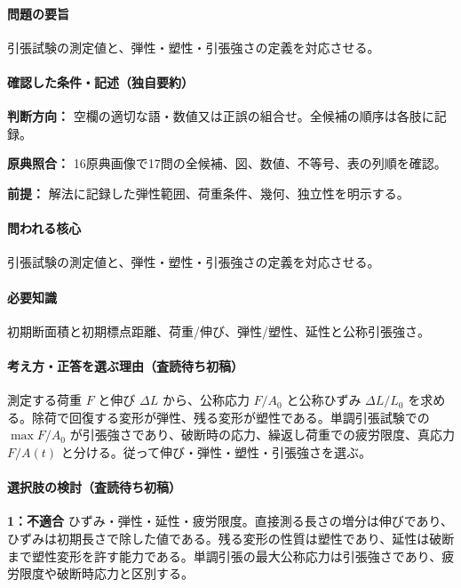 \paragraph{問題の要旨} 引張試験の測定値と、弾性・塑性・引張強さの定義を対応させる。

\paragraph{確認した条件・記述（独自要約）}\mbox{}\par

\noindent\textbf{判断方向：} 空欄の適切な語・数値又は正誤の組合せ。全候補の順序は各肢に記録。\par

\noindent\textbf{原典照合：} 16原典画像で17問の全候補、図、数値、不等号、表の列順を確認。\par

\noindent\textbf{前提：} 解法に記録した弾性範囲、荷重条件、幾何、独立性を明示する。\par

\paragraph{問われる核心} 引張試験の測定値と、弾性・塑性・引張強さの定義を対応させる。

\paragraph{必要知識} 初期断面積と初期標点距離、荷重/伸び、弾性/塑性、延性と公称引張強さ。

\paragraph{考え方・正答を選ぶ理由（査読待ち初稿）} 測定する荷重 \(F\) と伸び \(\Delta L\) から、公称応力 \(F/A_0\) と公称ひずみ \(\Delta L/L_0\) を求める。除荷で回復する変形が弾性、残る変形が塑性である。単調引張試験での \(\max F/A_0\) が引張強さであり、破断時の応力、繰返し荷重での疲労限度、真応力 \(F/A(t)\) と分ける。従って伸び・弾性・塑性・引張強さを選ぶ。

\paragraph{選択肢の検討（査読待ち初稿）}\mbox{}\par

\noindent\textbf{1：不適合} ひずみ・弾性・延性・疲労限度。直接測る長さの増分は伸びであり、ひずみは初期長さで除した値である。残る変形の性質は塑性であり、延性は破断まで塑性変形を許す能力である。単調引張の最大公称応力は引張強さであり、疲労限度や破断時応力と区別する。\par

